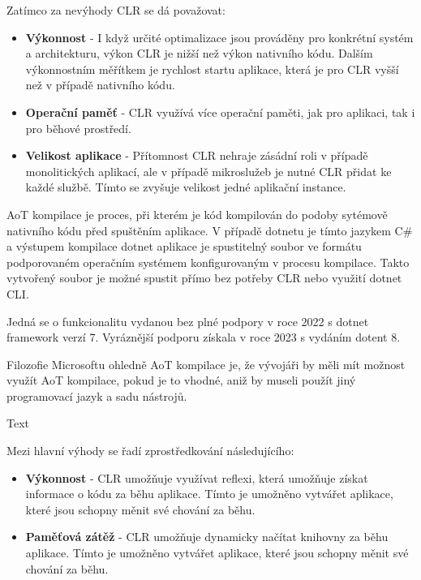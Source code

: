 Zatímco za nevýhody CLR se dá považovat:
\begin{itemize}
    \item  \textbf{Výkonnost} - I když určité optimalizace jsou prováděny pro konkrétní systém a architekturu, výkon CLR je nižší než výkon nativního kódu. Dalším výkonnostním měřítkem je rychlost startu aplikace, která je pro CLR vyšší než v případě nativního kódu.
    \item \textbf{Operační paměť} - CLR využívá více operační paměti, jak pro aplikaci, tak i pro běhové prostředí.
    \item \textbf{Velikost aplikace} - Přítomnost CLR nehraje zásádní roli v případě monolitických aplikací, ale v případě mikroslužeb je nutné CLR přidat ke každé službě. Tímto se zvyšuje velikost jedné aplikační instance.
\end{itemize}

AoT kompilace je proces, při kterém je kód kompilován do podoby sytémově nativního kódu před spuštěním aplikace. V případě dotnetu je tímto jazykem C\# a výstupem kompilace dotnet aplikace je spustitelný soubor ve formátu podporovaném operačním systémem konfigurovaným v procesu kompilace. Takto vytvořený soubor je možné spustit přímo bez potřeby CLR nebo využití dotnet CLI. 

Jedná se o funkcionalitu vydanou bez plné podpory v roce 2022 s dotnet framework verzí 7. Vyráznější podporu získala v roce 2023 s vydáním dotent 8. \cite{aot}

Filozofie Microsoftu ohledně AoT kompilace je, že vývojáři by měli mít možnost využít AoT kompilace, pokud je to vhodné, aniž by museli použít jiný programovací jazyk a sadu nástrojů.

Text


Mezi hlavní výhody se řadí zprostředkování následujícího:
\begin{itemize}
    \item  \textbf{Výkonnost} - CLR umožňuje využívat reflexi, která umožňuje získat informace o kódu za běhu aplikace. Tímto je umožněno vytvářet aplikace, které jsou schopny měnit své chování za běhu.
    \item \textbf{Paměťová zátěž} - CLR umožňuje dynamicky načítat knihovny za běhu aplikace. Tímto je umožněno vytvářet aplikace, které jsou schopny měnit své chování za běhu.
\end{itemize}


